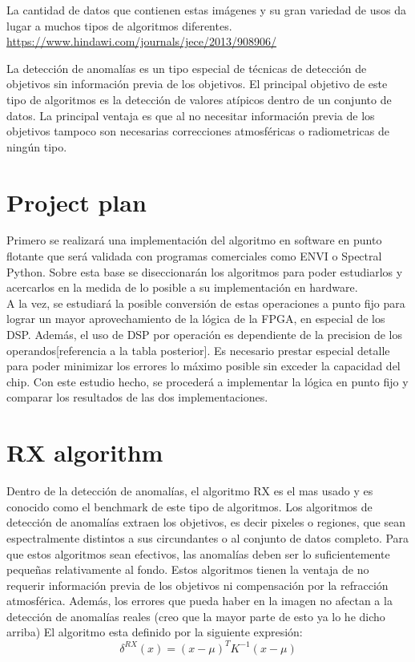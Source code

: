 La cantidad de datos que contienen estas imágenes y su gran variedad de usos da lugar a muchos tipos de algoritmos diferentes.
\\
\url{https://www.hindawi.com/journals/jece/2013/908906/}

La detección de anomalías es un tipo especial de técnicas de detección de objetivos sin información previa de los objetivos. El principal objetivo de este tipo de algoritmos es la detección de valores atípicos dentro de un conjunto de datos. La principal ventaja es que al no necesitar información previa de los objetivos tampoco son necesarias correcciones atmosféricas o radiometricas de ningún tipo.


\section{Project plan}
Primero se realizará una implementación del algoritmo en software en punto flotante que será validada con programas comerciales como ENVI o Spectral Python. Sobre esta base se diseccionarán los algoritmos para poder estudiarlos y acercarlos en la medida de lo posible a su implementación en hardware.
\\
A la vez, se estudiará la posible conversión de estas operaciones a punto fijo para lograr un mayor aprovechamiento de la lógica de la FPGA, en especial de los DSP. Además, el uso de DSP por operación es dependiente de la precision de los operandos[referencia a la tabla posterior]. Es necesario prestar especial detalle para poder minimizar los errores lo máximo posible sin exceder la capacidad del chip. Con este estudio hecho, se procederá a implementar la lógica en punto fijo y comparar los resultados de las dos implementaciones.


\section{RX algorithm}
Dentro de la detección de anomalías, el algoritmo RX es el mas usado y es conocido como el benchmark de este tipo de algoritmos.
Los algoritmos de detección de anomalías extraen los objetivos, es decir pixeles o regiones, que sean espectralmente distintos a sus circundantes o al conjunto de datos completo. Para que estos algoritmos sean efectivos, las anomalías deben ser lo suficientemente pequeñas relativamente al fondo. Estos algoritmos tienen la ventaja de no requerir información previa de los objetivos ni compensación por la refracción atmosférica. Además, los errores que pueda haber en la imagen no afectan a la detección de anomalías reales (creo que la mayor parte de esto ya lo he dicho arriba)
\bigskip
El algoritmo esta definido por la siguiente expresión:
\\
\[\delta ^{RX}(x) = (x-\mu)^{T}K^{-1}(x-\mu)\]

